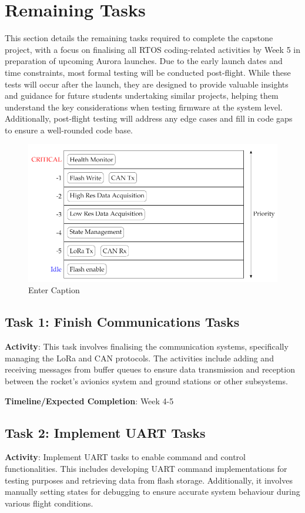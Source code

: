 \section{Remaining Tasks}
This section details the remaining tasks required to complete the capstone project, with a focus on finalising all RTOS coding-related activities by Week 5 in preparation of upcoming Aurora launches. Due to the early launch dates and time constraints, most formal testing will be conducted post-flight. While these tests will occur after the launch, they are designed to provide valuable insights and guidance for future students undertaking similar projects, helping them understand the key considerations when testing firmware at the system level. Additionally, post-flight testing will address any edge cases and fill in code gaps to ensure a well-rounded code base.
\begin{figure}
    \centering
    \includegraphics[width=1\linewidth]{img/RTOS-task-hierarchy.png}
    \caption{Enter Caption}
    \label{fig:enter-label}
\end{figure}

\subsection{Task 1: Finish Communications Tasks}
\textbf{Activity}: This task involves finalising the communication systems, specifically managing the LoRa and CAN protocols. The activities include adding and receiving messages from buffer queues to ensure data transmission and reception between the rocket's avionics system and ground stations or other subsystems. 

\textbf{Timeline/Expected Completion}: Week 4-5

\subsection{Task 2: Implement UART Tasks}
\textbf{Activity}: Implement UART tasks to enable command and control functionalities. This includes developing UART command implementations for testing purposes and retrieving data from flash storage. Additionally, it involves manually setting states for debugging to ensure accurate system behaviour during various flight conditions. 

